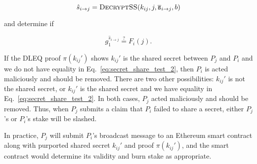 \begin{equation}
    \hat{s}_{i\to j}
        = \textsc{DecryptSS}(k_{ij},j,\overline{\texttt{s}}_{i\to j}, b)
\end{equation}

\noindent
and determine if

\begin{equation}
    g_{1}^{\hat{s}_{i\to j}} \overset{?}{=} F_{i}(j).
    \label{eq:secret_share_test_2}
\end{equation}

\noindent
If the DLEQ proof $\pi(k_{ij}')$ shows $k_{ij}'$ is the shared
secret between $P_{j}$ and $P_{i}$ and we do not have equality in
Eq.~\eqref{eq:secret_share_test_2}, then $P_{i}$ is acted maliciously
and should be removed.
There are two other possibilities:
$k_{ij}'$ is not the shared secret, or $k_{ij}'$ is the shared secret
and we have equality in Eq.~\eqref{eq:secret_share_test_2}.
In both cases, $P_{j}$ acted maliciously and should be removed.
Thus, when $P_{j}$ submits a claim that $P_{i}$
failed to share a secret,
either $P_{j}$'s or $P_{i}$'s stake will be slashed.

In practice, $P_{j}$ will submit $P_{i}$'s broadcast message to an
Ethereum smart contract along with purported shared secret $k_{ij}'$
and proof $\pi(k_{ij}')$, and the smart contract would
determine its validity and burn stake as appropriate.



